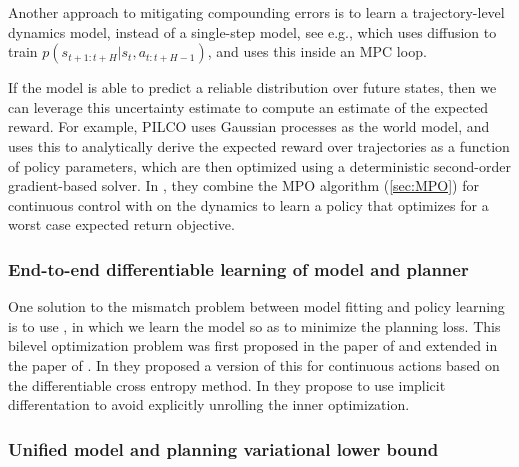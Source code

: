 Another approach to mitigating compounding errors
is to learn a trajectory-level dynamics model,
instead of a single-step model,
see e.g., \citep{dmpc} which uses diffusion to train
$p(s_{t+1:t+H}|s_t,a_{t:t+H-1})$,
  and uses this inside an MPC loop.


If the model is able to predict a reliable distribution
over future states, then we can leverage this uncertainty
estimate to compute an estimate of the expected reward.
For example, PILCO
\citep{pilco,pilcoJ} uses Gaussian processes as the world model,
and uses this to analytically derive the expected reward over
trajectories as a function of policy parameters,
which are then optimized using a deterministic second-order
gradient-based solver.
In 
\citep{Mankowitz2019}, they combine the MPO algorithm
(\cref{sec:MPO}) for continuous control
with  on the dynamics to
learn a policy that optimizes for a worst case expected return
objective.



\subsubsection{End-to-end differentiable learning of model and planner}
\label{sec:endToEnd}
\label{sec:differentiable-planning}

One solution to the  mismatch  problem between model fitting
and policy learning is to use
,
in which we learn the model so as to minimize the planning loss.
This bilevel optimization problem was first proposed
in the  paper
of \citep{Tamar2016}
and extended
in the  paper
of \citep{treeQN}.
In \citep{Amos2019DCEM} they proposed a version of
this for continuous actions based on the differentiable
cross entropy method.
In \citep{Nikishin2022,Bansal2023}
they propose to use implicit differentation to avoid
explicitly unrolling the inner optimization.

\subsubsection{Unified model and planning variational lower bound}
\label{sec:unified}

